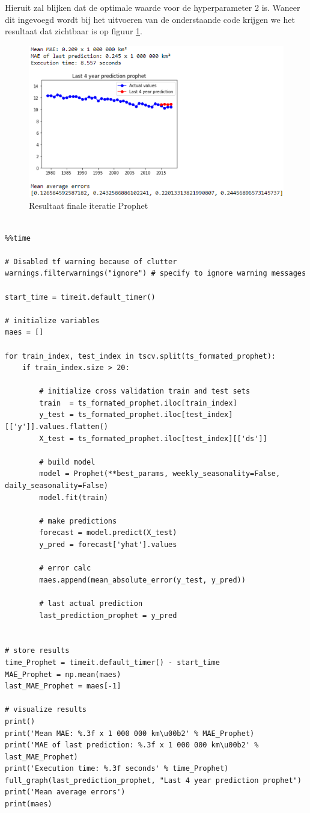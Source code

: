Hieruit zal blijken dat de optimale waarde voor de hyperparameter 2 is. Waneer dit ingevoegd wordt bij het uitvoeren van de onderstaande code krijgen we het resultaat dat zichtbaar is op figuur \ref{fig:uvnsprophet}.

\begin{figure}
    \centering
    \caption{Resultaat finale iteratie Prophet}
    \label{fig:uvnsprophet}
    \includegraphics[width=0.7\linewidth]{uv_ns_prophet}
\end{figure}


\begin{verbatim}

%%time

# Disabled tf warning because of clutter
warnings.filterwarnings("ignore") # specify to ignore warning messages

start_time = timeit.default_timer()

# initialize variables
maes = []

for train_index, test_index in tscv.split(ts_formated_prophet):
    if train_index.size > 20:  
    
        # initialize cross validation train and test sets
        train  = ts_formated_prophet.iloc[train_index]
        y_test = ts_formated_prophet.iloc[test_index][['y']].values.flatten()
        X_test = ts_formated_prophet.iloc[test_index][['ds']]
        
        # build model
        model = Prophet(**best_params, weekly_seasonality=False, daily_seasonality=False)
        model.fit(train)
        
        # make predictions
        forecast = model.predict(X_test)
        y_pred = forecast['yhat'].values
        
        # error calc
        maes.append(mean_absolute_error(y_test, y_pred))
        
        # last actual prediction 
        last_prediction_prophet = y_pred


# store results
time_Prophet = timeit.default_timer() - start_time
MAE_Prophet = np.mean(maes)
last_MAE_Prophet = maes[-1]

# visualize results
print()
print('Mean MAE: %.3f x 1 000 000 km\u00b2' % MAE_Prophet)
print('MAE of last prediction: %.3f x 1 000 000 km\u00b2' % last_MAE_Prophet)
print('Execution time: %.3f seconds' % time_Prophet)
full_graph(last_prediction_prophet, "Last 4 year prediction prophet")
print('Mean average errors')
print(maes)

\end{verbatim}

